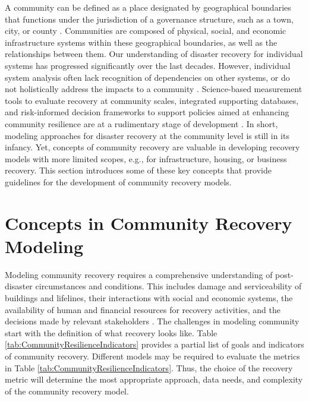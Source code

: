 A community can be defined as a place designated by geographical boundaries that functions under the jurisdiction of a governance structure, such as a town, city, or county \citep{kwasinski2016conceptual}. Communities are composed of physical, social, and economic infrastructure systems within these geographical boundaries, as well as the relationships between them. Our understanding of disaster recovery for individual systems has progressed significantly over the last decades. However, individual system analysis often lack recognition of dependencies on other systems, or do not holistically address the impacts to a community \citep{kwasinski2016conceptual}. Science-based measurement tools to evaluate recovery at community scales, integrated supporting databases, and risk-informed decision frameworks to support policies aimed at enhancing community resilience are at a rudimentary stage of development \citep{Ellingwood2016}. In short, modeling approaches for disaster recovery at the community level is still in its infancy. Yet, concepts of community recovery are valuable in developing recovery models with more limited scopes, e.g., for infrastructure, housing, or business recovery. This section introduces some of these key concepts that provide guidelines for the development of community recovery models. \ 

\section{Concepts in Community Recovery Modeling} 
Modeling community recovery requires a comprehensive understanding of post-disaster circumstances and conditions. This includes damage and serviceability of buildings and lifelines, their interactions with social and economic systems, the availability of human and financial resources for recovery activities, and the decisions made by relevant stakeholders \citep{deshmukh2012framework}. The challenges in modeling community start with the definition of what recovery looks like. Table \ref{tab:CommunityResilienceIndicators} provides a partial list of goals and indicators of community recovery. Different models may be required to evaluate the metrics in Table \ref{tab:CommunityResilienceIndicators}. Thus, the choice of the recovery metric will determine the most appropriate approach, data needs, and complexity of the community recovery model.\ 

